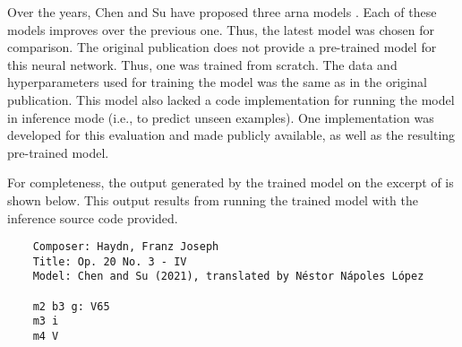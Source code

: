 
Over the years, Chen and Su have proposed three \gls{arna}
models \parencite{chen2018functional, chen2019harmony,
chen2021attend}. Each of these models improves over the
previous one. Thus, the latest model
\parencite{chen2021attend} was chosen for comparison. The
original publication does not provide a pre-trained model
for this neural network. Thus, one was trained from scratch.
The data and hyperparameters used for training the model was
the same as in the original publication. This model also
lacked a code implementation for running the model in
inference mode (i.e., to predict unseen examples). One
implementation was developed for this evaluation and made
publicly available, as well as the resulting pre-trained
model.

For completeness, the output generated by the trained model
on the excerpt of  is shown below. This
output results from running the trained model with the
inference source code provided.

\begin{verbatim}
    Composer: Haydn, Franz Joseph
    Title: Op. 20 No. 3 - IV
    Model: Chen and Su (2021), translated by Néstor Nápoles López

    m2 b3 g: V65
    m3 i
    m4 V
\end{verbatim}
